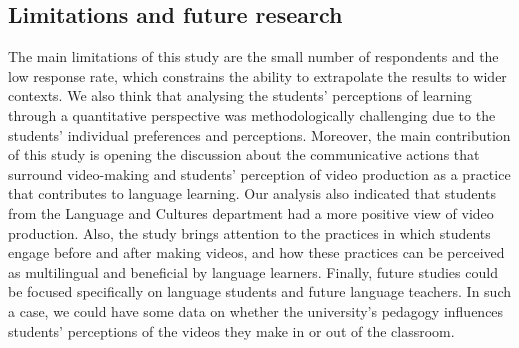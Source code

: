 \subsection{Limitations and future research}
The main limitations of this study are the small number of respondents and the low response rate, which constrains the ability to extrapolate the results to wider contexts. We also think that analysing the students’ perceptions of learning through a quantitative perspective was methodologically challenging due to the students’ individual preferences and perceptions. Moreover, the main contribution of this study is opening the discussion about the communicative actions that surround video-making and students’ perception of video production as a practice that contributes to language learning. Our analysis also indicated that students from the Language and Cultures department had a more positive view of video production. Also, the study brings attention to the practices in which students engage before and after making videos, and how these practices can be perceived as multilingual and beneficial by language learners. Finally, future studies could be focused specifically on language students and future language teachers. In such a case,  we could have some data on whether the university’s pedagogy influences students' perceptions of the videos they make in or out of the classroom.

